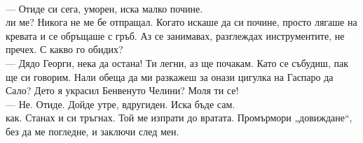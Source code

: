 \documentclass[12pt,a4paper]{article}
\begin{document}
\\
— Отиде си сега, уморен, иска малко почине.
\\
 ли ме? Никога не ме бе отпращал. Когато искаше да си почине, просто лягаше на кревата и се обръщаше с гръб. Аз се занимавах, разглеждах инструментите, не пречех. С какво го обидих?
\\
— Дядо Георги, нека да остана! Ти легни, аз ще почакам. Като се събудиш, пак ще си говорим. Нали обеща да ми разкажеш за онази цигулка на Гаспаро да Сало? Дето я украсил Бенвенуто Челини? Моля ти се!
\\
— Не. Отиде. Дойде утре, вдругиден. Иска бъде сам.
\\
 как. Станах и си тръгнах. Той ме изпрати до вратата. Промърмори „довиждане“, без да ме погледне, и заключи след мен.
\end{document}
